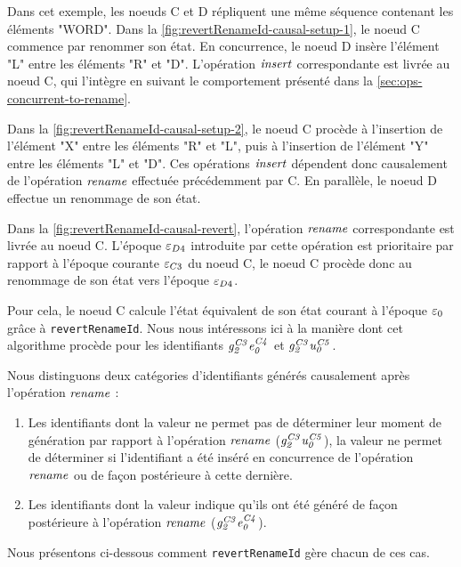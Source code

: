 Dans cet exemple, les noeuds C et D répliquent une même séquence contenant les éléments "WORD".
Dans la \autoref{fig:revertRenameId-causal-setup-1}, le noeud C commence par renommer son état.
En concurrence, le noeud D insère l'élément "L" entre les éléments "R" et "D".
L'opération $\mathit{insert}$ correspondante est livrée au noeud C, qui l'intègre en suivant le comportement présenté dans la \autoref{sec:ops-concurrent-to-rename}.

Dans la \autoref{fig:revertRenameId-causal-setup-2}, le noeud C procède à l'insertion de l'élément "X" entre les éléments "R" et "L", puis à l'insertion de l'élément "Y" entre les éléments "L" et "D".
Ces opérations $\mathit{insert}$ dépendent donc causalement de l'opération $\mathit{rename}$ effectuée précédemment par C.
En parallèle, le noeud D effectue un renommage de son état.

Dans la \autoref{fig:revertRenameId-causal-revert}, l'opération $\mathit{rename}$ correspondante est livrée au noeud C.
L'époque $\varepsilon_{D4}$ introduite par cette opération est prioritaire par rapport à l'époque courante $\varepsilon_{C3}$ du noeud C, le noeud C procède donc au renommage de son état vers l'époque $\varepsilon_{D4}$.

Pour cela, le noeud C calcule l'état équivalent de son état courant à l'époque $\varepsilon_{0}$ grâce à \texttt{revertRenameId}.
Nous nous intéressons ici à la manière dont cet algorithme procède pour les identifiants $\mathit{g}^{\mathit{C3}}_{\mathit{2}}\mathit{e}^{\mathit{C4}}_{\mathit{0}}$ et $\mathit{g}^{\mathit{C3}}_{\mathit{2}}\mathit{u}^{\mathit{C5}}_{\mathit{0}}$.

Nous distinguons deux catégories d'identifiants générés causalement après l'opération $\mathit{rename}$ :
\begin{enumerate}
    \item \label{item:id-causal-rename-unknown}
        Les identifiants dont la valeur ne permet pas de déterminer leur moment de génération par rapport à l'opération $\mathit{rename}$ (\eg $\mathit{g}^{\mathit{C3}}_{\mathit{2}}\mathit{u}^{\mathit{C5}}_{\mathit{0}}$), \ie la valeur ne permet de déterminer si l'identifiant a été inséré en concurrence de l'opération $\mathit{rename}$ ou de façon postérieure à cette dernière.
    \item \label{item:id-causal-rename-determined}
        Les identifiants dont la valeur indique qu'ils ont été généré de façon postérieure à l'opération $\mathit{rename}$ (\eg $\mathit{g}^{\mathit{C3}}_{\mathit{2}}\mathit{e}^{\mathit{C4}}_{\mathit{0}}$).
\end{enumerate}
Nous présentons ci-dessous comment \texttt{revertRenameId} gère chacun de ces cas.

